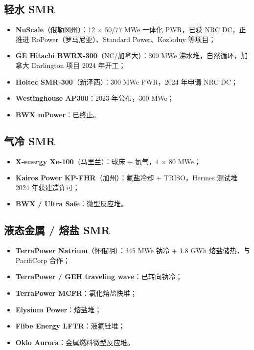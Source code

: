 \documentclass[
  UTF8,
  scheme=plain,
  fontsize=10pt,
  openany
]{ctexbook}
\begin{document}
\subsection{轻水 SMR}\label{ux8f7bux6c34-smr}

\begin{itemize}
\tightlist
\item
  \textbf{NuScale}（俄勒冈州）：12 × 50/77 MWe 一体化 PWR，已获 NRC
  DC，正推进 RoPower（罗马尼亚）、Standard Power、Kozloduy 等项目；
\item
  \textbf{GE Hitachi BWRX-300}（NC/加拿大）：300 MWe
  沸水堆，自然循环，加拿大 Darlington 项目 2024 年开工；
\item
  \textbf{Holtec SMR-300}（新泽西）：300 MWe PWR，2024 年申请 NRC DC；
\item
  \textbf{Westinghouse AP300}：2023 年公布，300 MWe；
\item
  \textbf{BWX mPower}：已终止。
\end{itemize}

\subsection{气冷 SMR}\label{ux6c14ux51b7-smr}

\begin{itemize}
\tightlist
\item
  \textbf{X-energy Xe-100}（马里兰）：球床 + 氦气，4 × 80 MWe；
\item
  \textbf{Kairos Power KP-FHR}（加州）：氟盐冷却 + TRISO，Hermes 测试堆
  2024 年获建造许可；
\item
  \textbf{BWX / Ultra Safe}：微型反应堆。
\end{itemize}

\subsection{液态金属 / 熔盐
SMR}\label{ux6db2ux6001ux91d1ux5c5e-ux7194ux76d0-smr}

\begin{itemize}
\tightlist
\item
  \textbf{TerraPower Natrium}（怀俄明）：345 MWe 钠冷 + 1.8 GWh
  熔盐储热，与 PacifiCorp 合作；
\item
  \textbf{TerraPower / GEH traveling wave}：已转向钠冷；
\item
  \textbf{TerraPower MCFR}：氯化熔盐快堆；
\item
  \textbf{Elysium Power}：熔盐堆；
\item
  \textbf{Flibe Energy LFTR}：液氟钍堆；
\item
  \textbf{Oklo Aurora}：金属燃料微型反应堆。
\end{itemize}
\end{document}
